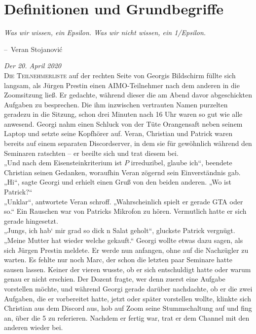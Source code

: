 \documentclass[oneside]{memoir}
\makeatletter
\newenvironment{chapquote}[2][2em]
  {\setlength{\@tempdima}{#1}%
   \def\chapquote@author{#2}%
   \parshape 1 \@tempdima \dimexpr\textwidth-2\@tempdima\relax%
   \itshape}
  {\par\normalfont\hfill--\ \chapquote@author\hspace*{\@tempdima}\par\bigskip}
\makeatother
\begin{document}
\chapter{Definitionen und Grundbegriffe} %
\begin{chapquote}{Veran Stojanović}
\glqq Was wir wissen, ein Epsilon. Was wir nicht wissen, ein 1/Epsilon.\grqq
\end{chapquote}
\textit{Der 20. April 2020} \\ 
\lettrine{D}{ie Teilnehmerliste} auf der rechten Seite von Georgis Bildschirm füllte sich langsam, als Jürgen Prestin einen AIMO-Teilnehmer nach dem anderen in die Zoomsitzung ließ. Er gedachte, während dieser die am Abend davor abgeschickten Aufgaben zu besprechen. Die ihm inzwischen vertrauten Namen purzelten geradezu in die Sitzung, schon drei Minuten nach 16 Uhr waren so gut wie alle anwesend. Georgi nahm einen Schluck von der Tüte Orangensaft neben seinem Laptop und setzte seine Kopfhörer auf. Veran, Christian und Patrick waren bereits auf einem separaten Discordserver, in dem sie für gewöhnlich während den Seminaren ratschten – er beeilte sich und trat diesem bei. \\
„Und nach dem Eisensteinkriterium ist $P$ irreduzibel, glaube ich“, beendete Christian seinen Gedanken, woraufhin Veran zögernd sein Einverständnis gab. \\
„Hi“, sagte Georgi und erhielt einen Gruß von den beiden anderen. „Wo ist Patrick?“ \\
„Unklar“, antwortete Veran schroff. „Wahrscheinlich spielt er gerade GTA oder so.“
Ein Rauschen war von Patricks Mikrofon zu hören. Vermutlich hatte er sich gerade hingesetzt. \\ 
„Jungs, ich hab‘ mir grad so dick n Salat geholt“, gluckste Patrick vergnügt. „Meine Mutter hat wieder welche gekauft.“
Georgi wollte etwas dazu sagen, als sich Jürgen Prestin meldete. Er werde nun anfangen, ohne auf die Nachzügler zu warten. Es fehlte nur noch Marc, der schon die letzten paar Seminare hatte sausen lassen. Keiner der vieren wusste, ob er sich entschuldigt hatte oder warum genau er nicht erschien. Der Dozent fragte, wer denn zuerst eine Aufgabe vorstellen möchte, und während Georgi gerade darüber nachdachte, ob er die zwei Aufgaben, die er vorbereitet hatte, jetzt oder später vorstellen wollte, klinkte sich Christian aus dem Discord aus, hob auf Zoom seine Stummschaltung auf und fing an, über die 5 zu referieren. 
Nachdem er fertig war, trat er dem Channel mit den anderen wieder bei.  \\
\end{document}

